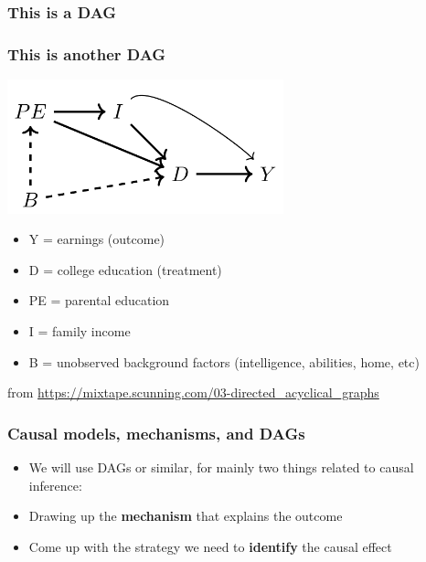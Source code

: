 \documentclass[aspectratio=43]{beamer}
\begin{document}
\begin{frame}
\frametitle{This is a DAG}
\centering


\end{frame}


\begin{frame}
\frametitle{This is another DAG}
\centering

\includegraphics[width = 0.6\textwidth]{../img/dag_earnings}

\vspace{15pt}

\begin{itemize}\footnotesize
  \item Y = earnings (outcome)
  \item D = college education (treatment)
  \item PE = parental education
  \item I = family income
  \item B = unobserved background factors (intelligence, abilities, home, etc)
\end{itemize}



{\tiny from \url{https://mixtape.scunning.com/03-directed_acyclical_graphs}}

\end{frame}

\begin{frame}
\frametitle{Causal models, mechanisms, and DAGs}
\centering

\begin{itemize}
  \item[] We will use DAGs or similar, for mainly two things related to causal inference:
  \item Drawing up the \textbf{mechanism} that explains the outcome
  \item Come up with the strategy we need to \textbf{identify} the causal effect
\end{itemize}

\end{frame}
\end{document}
